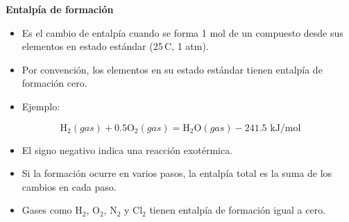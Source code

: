\documentclass[../../main.tex]{subfiles}
\begin{document}
\begin{frame}{\textbf{Entalp\'ia de formaci\'on}}
\begin{itemize}
  \item Es el cambio de entalp\'ia cuando se forma 1 mol de un compuesto desde sus elementos en estado est\'andar (25\,\textdegree C, 1 atm).
  \item Por convenci\'on, los elementos en su estado est\'andar tienen entalp\'ia de formaci\'on cero.
  \item Ejemplo:
\end{itemize}

\[
\text{H}_2 (gas) + 0.5\text{O}_2 (gas) = \text{H}_2\text{O} (gas)  -241.5 \text{ kJ/mol} 
\]

\begin{itemize}
  \item El signo negativo indica una reacci\'on exot\'ermica.
  \item Si la formaci\'on ocurre en varios pasos, la entalp\'ia total es la suma de los cambios en cada paso.
  \item Gases como H$_2$, O$_2$, N$_2$ y Cl$_2$ tienen entalp\'ia de formaci\'on igual a cero.
\end{itemize}
\end{frame}
\end{document}
